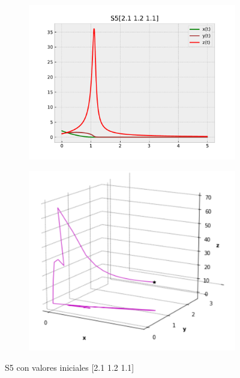 \documentclass{wscpaperproc}
\theoremstyle{wsc}
\begin{document}
\begin{figure}[h]
	\centering
	\begin{subfigure}[b]{0.5\textwidth}
		\centering
		\includegraphics[width=\textwidth]{Simulations/S5[2.1 1.2 1.1].pdf}
	
		\label{fig:comparativa101}
	\end{subfigure}%
	\begin{subfigure}[b]{0.5\textwidth}
		\centering
		\includegraphics[width=\textwidth]{GraficasPaper/S5[3d].png}
		\label{fig:comparativa102}
	\end{subfigure}
	\caption{S5 con valores iniciales [2.1 1.2 1.1]}

	\label{fig:comparacion14}
\end{figure}
\end{document}
